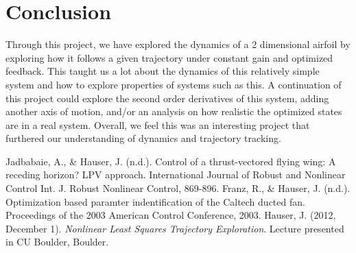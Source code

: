 \documentclass[journal]{IEEEtran}
\begin{document}
\section{Conclusion}
Through this project, we have explored the dynamics of a 2 dimensional airfoil by exploring how it follows a given trajectory under constant gain and optimized feedback. This taught us a lot about the dynamics of this relatively simple system and how to explore properties of systems such as this. A continuation of this project could explore the second order derivatives of this system, adding another axis of motion, and/or an analysis on how realistic the optimized states are in a real system.
Overall, we feel this was an interesting project that furthered our understanding of dynamics and trajectory tracking.
\begin{thebibliography}{9}
        Jadbabaie, A., \& Hauser, J. (n.d.). Control of a thrust-vectored flying wing: A receding horizon? LPV approach. International Journal of Robust and Nonlinear Control Int. J. Robust Nonlinear Control, 869-896.
        Franz, R., \& Hauser, J. (n.d.). Optimization based paramter indentification of the Caltech ducted fan. Proceedings of the 2003 American Control Conference, 2003.
        Hauser, J. (2012, December 1). \emph{Nonlinear Least Squares Trajectory Exploration}. Lecture presented in CU Boulder, Boulder.
\end{thebibliography}
\end{document}
